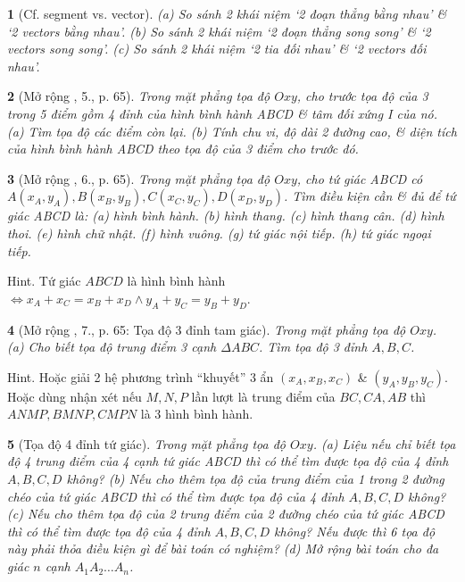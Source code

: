 \documentclass{article}
\newtheorem{baitoan}{}
\begin{document}
\begin{baitoan}[Cf. segment vs. vector]
	(a) So sánh 2 khái niệm `2 đoạn thẳng bằng nhau' \& `2 vectors bằng nhau'. (b) So sánh 2 khái niệm `2 đoạn thẳng song song' \& `2 vectors song song'. (c) So sánh 2 khái niệm `2 tia đối nhau' \& `2 vectors đối nhau'.
\end{baitoan}

\begin{baitoan}[Mở rộng \cite{SGK_Toan_10_Canh_Dieu_tap_2}, 5., p. 65]
	Trong mặt phẳng tọa độ $Oxy$, cho trước tọa độ của 3 trong 5 điểm gồm 4 đỉnh của hình bình hành ABCD \& tâm đối xứng I của nó. (a) Tìm tọa độ các điểm còn lại. (b) Tính chu vi, độ dài 2 đường cao, \& diện tích của hình bình hành ABCD theo tọa độ của 3 điểm cho trước đó.
\end{baitoan}

\begin{baitoan}[Mở rộng \cite{SGK_Toan_10_Canh_Dieu_tap_2}, 6., p. 65]
	Trong mặt phẳng tọa độ $Oxy$, cho tứ giác ABCD có $A(x_A,y_A),B(x_B,y_B),C(x_C,y_C),D(x_D,y_D)$. Tìm điều kiện cần \& đủ để tứ giác ABCD là: (a) hình bình hành. (b) hình thang. (c) hình thang cân. (d) hình thoi. (e) hình chữ nhật. (f) hình vuông. (g) tứ giác nội tiếp. (h) tứ giác ngoại tiếp.
\end{baitoan}
{\sf Hint.} Tứ giác $ABCD$ là hình bình hành $\Leftrightarrow x_A + x_C = x_B + x_D\land y_A + y_C = y_B + y_D$.

\begin{baitoan}[Mở rộng \cite{SGK_Toan_10_Canh_Dieu_tap_2}, 7., p. 65: Tọa độ 3 đỉnh tam giác]
	Trong mặt phẳng tọa độ $Oxy$. (a) Cho biết tọa độ trung điểm 3 cạnh $\Delta ABC$. Tìm tọa độ 3 đỉnh $A,B,C$.
\end{baitoan}
{\sf Hint.} Hoặc giải 2 hệ phương trình ``khuyết'' 3 ẩn $(x_A,x_B,x_C)$ \& $(y_A,y_B,y_C)$. Hoặc dùng nhận xét nếu $M,N,P$ lần lượt là trung điểm của $BC,CA,AB$ thì $ANMP,BMNP,CMPN$ là 3 hình bình hành.

\begin{baitoan}[Tọa độ 4 đỉnh tứ giác]
	Trong mặt phẳng tọa độ $Oxy$. (a) Liệu nếu chỉ biết tọa độ 4 trung điểm của 4 cạnh tứ giác ABCD thì có thể tìm được tọa độ của 4 đỉnh $A,B,C,D$ không? (b) Nếu cho thêm tọa độ của trung điểm của 1 trong 2 đường chéo của tứ giác ABCD thì có thể tìm được tọa độ của 4 đỉnh $A,B,C,D$ không? (c) Nếu cho thêm tọa độ của 2 trung điểm của 2 đường chéo của tứ giác ABCD thì có thể tìm được tọa độ của 4 đỉnh $A,B,C,D$ không? Nếu được thì 6 tọa độ này phải thỏa điều kiện gì để bài toán có nghiệm? (d) Mở rộng bài toán cho đa giác $n$ cạnh $A_1A_2\ldots A_n$.
\end{baitoan}
\end{document}
